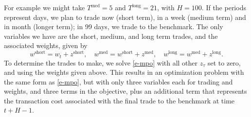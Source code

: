 \documentclass[openany]{article}  %
\newcommand{\trcosthat}{\hat \phi^\mathrm{trade}}
\renewcommand{\S}{section~}
\begin{document}
For example we might take $T^\mathrm{med}=5$ and
$T^\mathrm{long}=21$, with $H=100$.
If the periods represent days,
we plan to trade now (short term), in a week (medium term)
and in month (longer term); in 99 days, we trade to the benchmark.
The only variables we have
are the short, medium, and long term trades,
and the associated weights, given by
\[
w^\mathrm{short} = w_t + z^\mathrm{short}, \quad
w^\mathrm{med} = w^\mathrm{short} + z^\mathrm{med}, \quad
w^\mathrm{long} = w^\mathrm{med} + z^\mathrm{long}.
\]
To determine the trades to make, we solve \eqref{e-mpo} with
all other $z_\tau$ set to zero, and using the weights given above.
This results in an optimization problem with the same form
as \eqref{e-mpo}, but with only three variables each for trading and
weights, and three terms in the objective, plus an additional
term that represents the transaction cost associated with the final
trade to the benchmark at time $t+H-1$.


\end{document}
